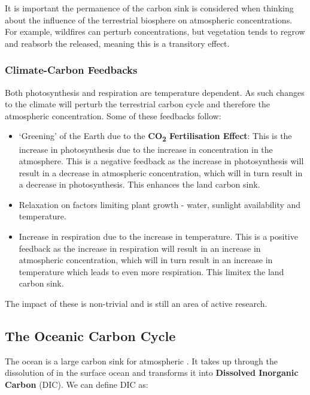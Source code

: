 It is important the permanence of the carbon sink is considered when thinking about the influence of the terrestrial
biosphere on atmospheric \COtwo concentrations. For example, wildfires can perturb concentrations, but vegetation
tends to regrow and reabsorb the \COtwo released, meaning this is a transitory effect.

\subsubsection{Climate-Carbon Feedbacks}
\label{sec:climate-carbon-feedbacks}

Both photosynthesis and respiration are temperature dependent. As such changes to the climate will perturb the terrestrial
carbon cycle and therefore the atmospheric \COtwo concentration. Some of these feedbacks follow:

\begin{itemize}
    \item `Greening' of the Earth due to the \textbf{CO\textsubscript{2} Fertilisation Effect}: This is the increase in
    photosynthesis due to the increase in \COtwo concentration in the atmosphere. This is a negative feedback as the
    increase in photosynthesis will result in a decrease in atmospheric \COtwo concentration, which will in turn result
    in a decrease in photosynthesis. This enhances the land carbon sink.
    \item Relaxation on factors limiting plant growth - water, sunlight availability and temperature.
    \item Increase in respiration due to the increase in temperature. This is a positive feedback as the increase in
    respiration will result in an increase in atmospheric \COtwo concentration, which will in turn result in an increase
    in temperature which leads to even more respiration. This limitex the land carbon sink.
\end{itemize}

The impact of these is non-trivial and is still an area of active research.

\subsection{The Oceanic Carbon Cycle}
\label{sec:oceanic-carbon-cycle}

The ocean is a large carbon sink for atmospheric \COtwo. It takes up \COtwo through the dissolution of \COtwo in the
surface ocean and transforms it into \textbf{Dissolved Inorganic Carbon} (DIC). We can define DIC as:

